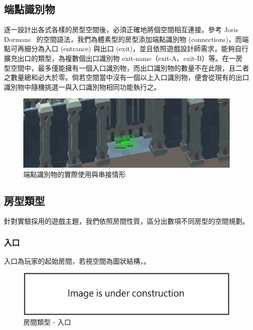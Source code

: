 \subsection{端點識別物}
\label{ssec:method-spacepieces-connections}

逐一設計出各式各樣的房型空間後，必須正確地將個空間相互連接。參考 Joris Dormans~\cite{dormans2010adventures} 的空間語法，我們為體素型的房型添加端點識別物 (connections)，而端點可再細分為入口 (entrance) 與出口 (exit)，並且依照遊戲設計師需求，能夠自行擴充出口的類型，為複數個出口識別物 exit-name（exit-A、exit-B）等。在一房型空間中，最多僅能擁有一個入口識別物，而出口識別物的數量不在此限，且二者之數量總和必大於零。倘若空間當中沒有一個以上入口識別物，便會從現有的出口識別物中隨機挑選一與入口識別物相同功能執行之。

\begin{figure}[ht]
  \begin{center}
    \includegraphics[width=1.0\textwidth]{figures/connections-in-volume.png}
    \caption{端點識別物的實際使用與串接情形} 
    \label{fig:connections-in-volume}
  \end{center}
\end{figure}

\subsection{房型類型}
\label{ssec:method-spacepieces-types}

針對實驗採用的遊戲主題，我們依照房間性質，區分出數項不同房型的空間規劃。

\subsubsection{入口}
\label{sssec:method-spacepieces-types-entrance}

入口為玩家的起始房間，若視空間為圖狀結構，。

\begin{figure}[ht]
  \begin{center}
    \includegraphics[width=1.0\textwidth]{figures/under_construction.png}
    \caption{房間類型 - 入口}
    \label{fig:roomtype-entrance}
  \end{center}
\end{figure}

